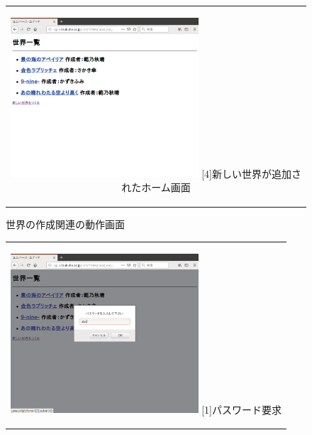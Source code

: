 \documentclass[12pt,a4paper]{jarticle}
\begin{document}
\begin{ttfamily}
\begin{figure}[htbp]
\begin{center}
\begin{tabular}{c}
      \begin{minipage}{0.53\hsize}
        \begin{center}
          \includegraphics[width=7.0cm]{10-3-4.eps}
          \hspace{1.6cm} [4]新しい世界が追加されたホーム画面
        \end{center}
      \end{minipage}\\

    \end{tabular}
    \caption{世界の作成関連の動作画面}
    \label{fig:a}
  \end{center}
\end{figure}

\begin{figure}[htbp]
  \begin{center}
    \begin{tabular}{c}

      \begin{minipage}{0.55\hsize}
        \begin{center}
          \includegraphics[width=7.0cm]{10-3-5.eps}
          \hspace{1.6cm} [1]パスワード要求
        \end{center}
      \end{minipage}


\end{tabular}
\end{center}
\end{figure}
\end{ttfamily}
\end{document}
